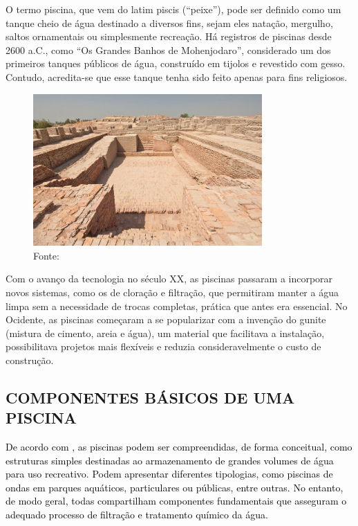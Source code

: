         O termo piscina, que vem do latim piscis (“peixe”), pode ser definido como um tanque cheio de água destinado a diversos fins, sejam eles natação, mergulho, saltos ornamentais ou simplesmente recreação\cite{piscinaOquee}. Há registros de piscinas desde 2600 a.C., como “Os Grandes Banhos de Mohenjodaro”, considerado um dos primeiros tanques públicos de água, construído em tijolos e revestido com gesso. Contudo, acredita-se que esse tanque tenha sido feito apenas para fins religiosos.
         \begin{figure}[H]
         	\centering
         	\caption{ }  
        	\centering
         	\label{fig:cont}
        	\includegraphics[width=0.78\textwidth]{imagens/primeiraPiscina.png}
        	\caption*{Fonte: \cite{piscinaHistoria}}
         \end{figure}
        
        Com o avanço da tecnologia no século XX, as piscinas passaram a incorporar novos sistemas, como os de cloração e filtração, que permitiram manter a água limpa sem a necessidade de trocas completas, prática que antes era essencial. No Ocidente, as piscinas começaram a se popularizar com a invenção do gunite (mistura de cimento, areia e água), um material que facilitava a instalação, possibilitava projetos mais flexíveis e reduzia consideravelmente o custo de construção\cite{piscinaHistoria}.

    \subsection{COMPONENTES BÁSICOS DE UMA PISCINA}
        
        \textcolor{black}{De acordo com \cite{refComponents}, as piscinas podem ser compreendidas, de forma conceitual, como estruturas simples destinadas ao armazenamento de grandes volumes de água para uso recreativo. Podem apresentar diferentes tipologias, como piscinas de ondas em parques aquáticos, particulares ou públicas, entre outras. No entanto, de modo geral, todas compartilham componentes fundamentais que asseguram o adequado processo de filtração e tratamento químico da água.}


